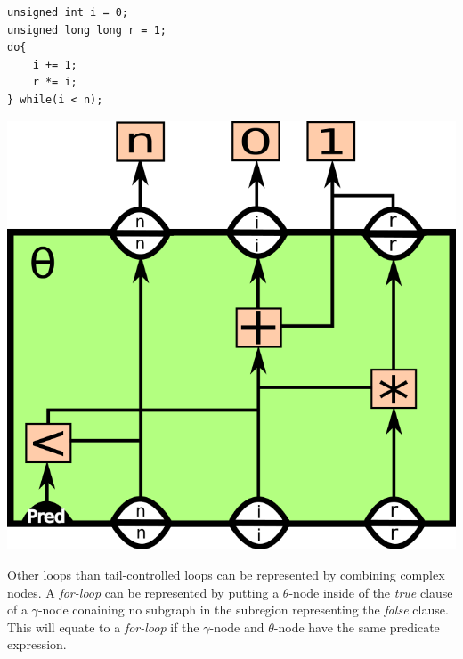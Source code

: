 \begin{itemize}
\begin{centering}
	\noindent\begin{minipage}{0.36\textwidth}
		\begin{CenteredBox}
		\begin{lstlisting}[style=global_customcpp,
label={lst:fig:factorial_loop_ex}, basicstyle=\fontsize{14}{1}]
unsigned int i = 0;
unsigned long long r = 1;
do{
	i += 1;
	r *= i;
} while(i < n);
		\end{lstlisting}
		\end{CenteredBox}
	\end{minipage}
	\noindent\begin{minipage}{0.55\textwidth}
		\captionsetup{type=figure}
		\includegraphics[width=\textwidth]{figures/iterative_factorial_ex}
	\end{minipage}
	\label{fig:factorial_loop_ex}
\end{centering}

Other loops than tail-controlled loops can be represented by combining complex
nodes. A \textit{for-loop} can be represented by putting a $\theta$-node inside
of the \textit{true} clause of a $\gamma$-node conaining no subgraph in the
subregion representing the \textit{false} clause. This will equate to a
\textit{for-loop} if the $\gamma$-node and $\theta$-node have the same predicate
expression.


\end{itemize}
